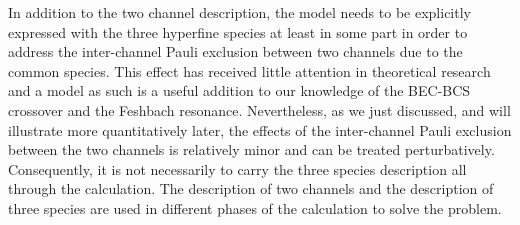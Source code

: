 %
% 
%
In addition to the two channel description, the model needs to be explicitly expressed with the three hyperfine species at least in some part in order to address the inter-channel  Pauli exclusion between two channels due to the common species.  This effect has received little  attention in theoretical research and a model as such is a useful addition to our knowledge of the BEC-BCS crossover and the Feshbach resonance.  Nevertheless, as we just discussed, and will illustrate more quantitatively later, the effects of the inter-channel Pauli exclusion between the two channels is relatively minor and can be treated perturbatively.  Consequently, it is not necessarily to carry the three species description all through the calculation.  The description of two channels and the description of three species are used in different phases of the calculation to solve the problem.  


